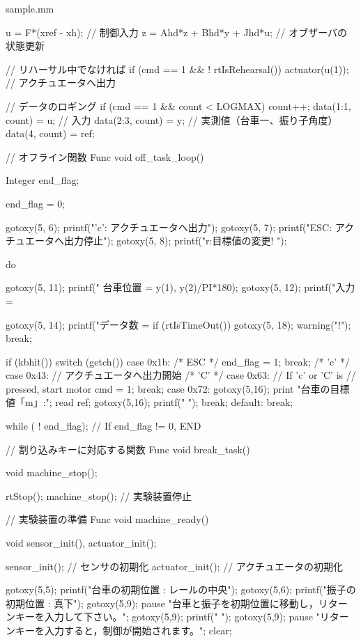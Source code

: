 \begin{itembox}[l]{sample.mm}
\begin{verbatimtab}[4]
{	u = F*(xref - xh); // 制御入力
	z = Ahd*z + Bhd*y + Jhd*u; // オブザーバの状態更新

	// リハーサル中でなければ
	if (cmd == 1 && ! rtIsRehearsal()) {
		actuator(u(1));	 		// アクチュエータへ出力
	}

	// データのロギング
	if (cmd == 1 && count < LOGMAX) {
		count++;
		data(1:1, count) = u; // 入力
		data(2:3, count) = y; // 実測値（台車一、振り子角度）
		data(4, count)  = ref;
	}
}

// オフライン関数
Func void off_task_loop()
{
	Integer end_flag;

	end_flag = 0;

	gotoxy(5, 6);
	printf("'c': アクチュエータへ出力");
	gotoxy(5, 7);
	printf("ESC: アクチュエータへ出力停止");
	gotoxy(5, 8);
	printf("r:目標値の変更! ");

	do {
		gotoxy(5, 11);
		printf("  台車位置 = %
			y(1), y(2)/PI*180);
		gotoxy(5, 12);
		printf("入力 = %

		gotoxy(5, 14);
		printf("データ数 = %
		if (rtIsTimeOut()) {
			gotoxy(5, 18);
			warning(" !\n");
			break;
		}

		if (kbhit()) {
			switch (getch()) {
			  case 0x1b:            /* ESC */
				end_flag = 1;
				break;
		/* 'c' */  case 0x43: // アクチュエータへ出力開始
		/* 'C' */  case 0x63: // If 'c' or 'C' is 
				      // pressed, start motor
				cmd = 1;
				break;
			   case 0x72:
			   	gotoxy(5,16);
				print "台車の目標値「m」:"; read ref;
				gotoxy(5,16);
				printf("  				");
				break;
			  default:
				break;
			}
		}
    } while ( ! end_flag);  // If end_flag != 0, END
}

// 割り込みキーに対応する関数
Func void break_task()
{
	void machine_stop();

	rtStop();
	machine_stop(); // 実験装置停止
}

// 実験装置の準備
Func void machine_ready()
{
	void sensor_init(), actuator_init();

	sensor_init();                  // センサの初期化
	actuator_init();                // アクチュエータの初期化

	gotoxy(5,5);
	printf("台車の初期位置 : レールの中央");
	gotoxy(5,6);
	printf("振子の初期位置 : 真下");
	gotoxy(5,9);
	pause "台車と振子を初期位置に移動し，リターンキーを入力して下さい。";
	gotoxy(5,9);
	printf("                                                            ");
	gotoxy(5,9);
	pause "リターンキーを入力すると，制御が開始されます。";
	clear;
}


\end{verbatimtab}
\end{itembox}
